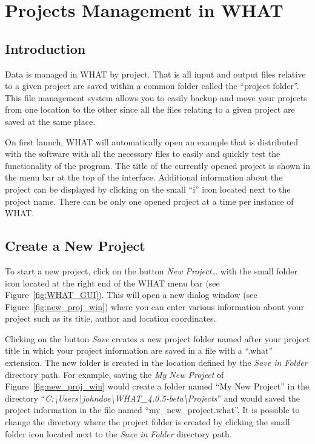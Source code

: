 \documentclass[WHATMANUAL.tex]{subfiles}
\begin{document}
\chapter{Projects Management in WHAT}\label{WHAT_projects}

\section{Introduction}

Data is managed in WHAT by project. That is all input and output files relative to a given project are saved within a common folder called the ``project folder''. This file management system allows you to easily backup and move your projects from one location to the other since all the files relating to a given project are saved at the same place. 

On first launch, WHAT will automatically open an example that is distributed with the software with all the necessary files to easily and quickly test the functionality of the program. The title of the currently opened project is shown in the menu bar at the top of the interface. Additional information about the project can be displayed by clicking on the small ``i'' icon located next to the project name. There can be only one opened project at a time per instance of WHAT. 

\section{Create a New Project}

To start a new project, click on the button \textsl{New Project\dots} with the small folder icon located at the right end of the WHAT menu bar (see Figure~\ref{fig:WHAT_GUI}). This will open a new dialog window (see Figure~\ref{fig:new_proj_win}) where you can enter various information about your project such as its title, author and location coordinates. 

Clicking on the button \textsl{Save} creates a new project folder named after your project title in which your project information are saved in a file with a ``.what'' extension. The new folder is created in the location defined by the \textsl{Save in Folder} directory path. For example, saving the \textsl{My New Project} of Figure~\ref{fig:new_proj_win} would create a folder named ``My New Project'' in the directory ``\textsl{C:\textbackslash{}Users\textbackslash{}johndoe\textbackslash{}WHAT\_4.0.5-beta\textbackslash{}Projects}'' and would saved the project information in the file named ``my\_new\_project.what''. It is possible to change the directory where the project folder is created by clicking the small folder icon located next to the \textsl{Save in Folder} directory path.
\end{document}
